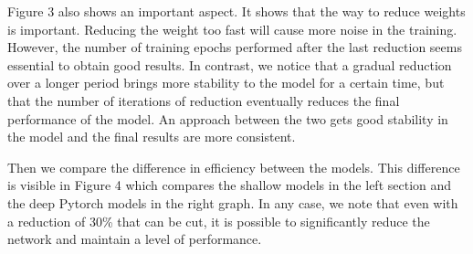 \documentclass[12pt]{article}
\begin{document}
Figure 3 also shows an important aspect. It shows that the way to reduce weights is important. Reducing the weight too fast will cause more noise in the training. However, the number of training epochs performed after the last reduction seems essential to obtain good results. In contrast, we notice that a gradual reduction over a longer period brings more stability to the model for a certain time, but that the number of iterations of reduction eventually reduces the final performance of the model. An approach between the two gets good stability in the model and the final results are more consistent.

Then we compare the difference in efficiency between the models. This difference is visible in Figure 4 which compares the shallow models in the left section and the deep Pytorch models in the right graph. In any case, we note that even with a reduction of 30\% that can be cut, it is possible to significantly reduce the network and maintain a level of performance.
\end{document}
